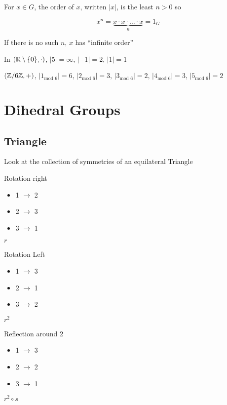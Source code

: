 \begin{definition}
  For $x \in G$, the order of $x$, written $|x|$, is the least $n > 0$ so

  \[x^n = \underbrace{x\cdot x\cdot \dotsc \cdot x}_n = 1_G\]
\end{definition}
If there is no such $n$, $x$ has ``infinite order''
\begin{example}
  In $(\mathbb R \setminus \{0\}, \cdot)$, $|5| = \infty$, $|-1| = 2$, $|1| = 1$
\end{example}

\begin{example}
  $(\mathbb Z/6\mathbb Z, +)$, $|1_{\text{mod } 6}| = 6$, $|2_{\text{mod } 6}| = 3$, $|3_{\text{mod } 6}| = 2$, $|4_{\text{mod } 6}| = 3$, $|5_{\text{mod } 6}| = 2$
\end{example}

\section{Dihedral Groups}

\subsection{Triangle}

Look at the collection of symmetries of an equilateral Triangle

\begin{center}
\end{center}

\begin{multicols}{3}
Rotation right
\begin{itemize}
  \item 1 $\rightarrow$ 2
  \item 2 $\rightarrow$ 3
  \item 3 $\rightarrow$ 1
\end{itemize}
$r$
\par

Rotation Left
\begin{itemize}
  \item 1 $\rightarrow$ 3
  \item 2 $\rightarrow$ 1
  \item 3 $\rightarrow$ 2
\end{itemize}
$r^2$

\par
Reflection around 2
\begin{itemize}
  \item 1 $\rightarrow$ 3
  \item 2 $\rightarrow$ 2
  \item 3 $\rightarrow$ 1
\end{itemize}
$r^2 \circ s$

\end{multicols}

